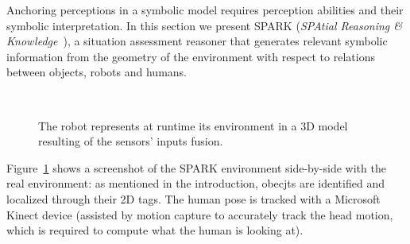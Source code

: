\documentclass{svmult}
\begin{document}
Anchoring perceptions in a symbolic model requires perception abilities
and their symbolic interpretation. In this section we present
SPARK (\emph{SPAtial Reasoning \& Knowledge}~\cite{Sisbot2011}), a situation assessment reasoner
that generates relevant symbolic information from the geometry of the
environment with respect to relations between objects, robots and humans.

\begin{figure}[ht!]
   \begin{center}
%
       \\ %
%
   \end{center}

   \caption{The robot represents at runtime its environment in a 3D model resulting of the sensors' inputs fusion.}%
   \label{fig|spark}

\end{figure}

Figure~\ref{fig|spark} shows a screenshot of the SPARK environment side-by-side
with the real environment: as mentioned in the introduction, obecjts are
identified and localized through their 2D tags. The human pose is tracked with
a Microsoft Kinect device (assisted by motion capture to accurately track the
head motion, which is required to compute what the human is looking at).
\end{document}
